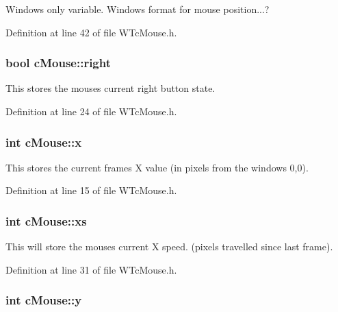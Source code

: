 Windows only variable. Windows format for mouse position...? 



Definition at line 42 of file WTcMouse.h.

\hypertarget{classc_mouse_a78814ee83b22c65e29a643cb46629ec7}{
\subsubsection[{right}]{\setlength{\rightskip}{0pt plus 5cm}bool {\bf cMouse::right}}}
\label{classc_mouse_a78814ee83b22c65e29a643cb46629ec7}


This stores the mouses current right button state. 



Definition at line 24 of file WTcMouse.h.

\hypertarget{classc_mouse_a7cf5f6cfeb1d68ad4b97d281503247d8}{
\subsubsection[{x}]{\setlength{\rightskip}{0pt plus 5cm}int {\bf cMouse::x}}}
\label{classc_mouse_a7cf5f6cfeb1d68ad4b97d281503247d8}


This stores the current frames X value (in pixels from the windows 0,0). 



Definition at line 15 of file WTcMouse.h.

\hypertarget{classc_mouse_a085f43f09da455412017745e4f0b9de5}{
\subsubsection[{xs}]{\setlength{\rightskip}{0pt plus 5cm}int {\bf cMouse::xs}}}
\label{classc_mouse_a085f43f09da455412017745e4f0b9de5}


This will store the mouses current X speed. (pixels travelled since last frame). 



Definition at line 31 of file WTcMouse.h.

\hypertarget{classc_mouse_ab29c5b17ff87340b22b7bfa1a862b657}{
\subsubsection[{y}]{\setlength{\rightskip}{0pt plus 5cm}int {\bf cMouse::y}}}
\label{classc_mouse_ab29c5b17ff87340b22b7bfa1a862b657}


